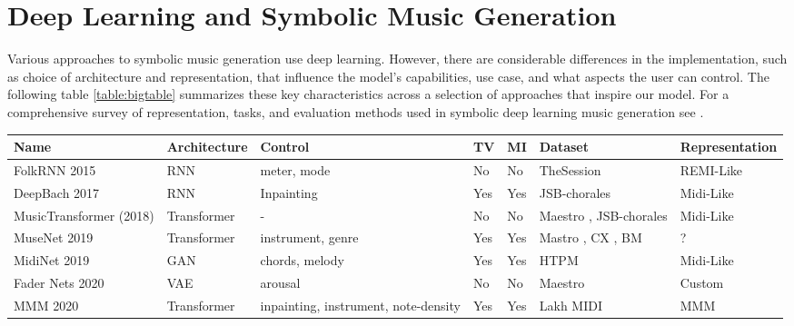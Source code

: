 \section{Deep Learning and Symbolic Music Generation}
Various approaches to symbolic music generation use deep learning. However, there are considerable differences in the implementation, such as choice of architecture and representation, that influence the model's capabilities, use case, and what aspects the user can control. The following table \ref{table:bigtable} summarizes these key characteristics across a selection of approaches that inspire our model. For a comprehensive survey of representation, tasks, and evaluation methods used in symbolic deep learning music generation see \cite{Ji_Yang_Luo_survey_symbolic_2024}.

\begin{table}[H]
    \centering
    \renewcommand{\arraystretch}{1.2} %
    \setlength{\tabcolsep}{3pt} %
    \scriptsize %
    \begin{tabular}{|p{2.5cm}|p{1.8cm}|p{3cm}|p{1cm}|p{1cm}|p{3cm}|p{2.5cm}|}
        \hline
        \textbf{Name} & \textbf{Architecture} & \textbf{Control} & \textbf{TV} & \textbf{MI} & \textbf{Dataset} & \textbf{Representation} \\
        \hline
        FolkRNN 2015 \cite{Sturm_Ben-Tal_2016} & RNN & meter, mode & No & No & TheSession \cite{sessionfolkdata} & REMI-Like\\
        DeepBach 2017 \cite{Hadjeres_Pachet_Nielsen_2017} & RNN & Inpainting & Yes & Yes & JSB-chorales \cite{jsbchorales} & Midi-Like\\ 
        MusicTransformer (2018) \cite{Huang_Vaswani_Uszkoreit_Shazeer_Simon_Hawthorne_Dai_Hoffman_Dinculescu_Eck_2018} & Transformer & - & No & No & Maestro \cite{hawthorne2018maestro},  JSB-chorales\cite{jsbchorales} & Midi-Like\\
        MuseNet 2019 \cite{Christine_2019} & Transformer & instrument, genre & Yes & Yes & Mastro \cite{hawthorne2018maestro}, CX \cite{classicalarchives}, BM \cite{bitmidi} & ?\\
        MidiNet 2019 \cite{midinet} & GAN & chords, melody & Yes & Yes & HTPM \cite{hooktheorypopmidi} & Midi-Like\\
        Fader Nets 2020\cite{Tan_Herremans_2020} & VAE & arousal & No & No & Maestro \cite{hawthorne2018maestro} & Custom \\
        MMM 2020 \cite{Ens_Pasquier_2020_MMM} & Transformer & inpainting, instrument, note-density & Yes & Yes & Lakh MIDI \cite{Raffel_2016} & MMM\\

\end{tabular}
\end{table}
